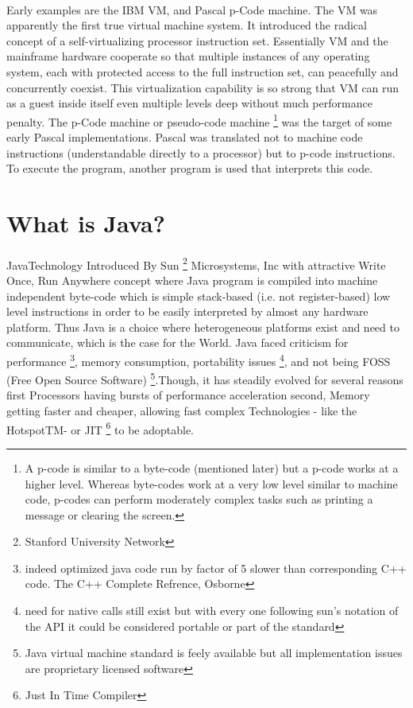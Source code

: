 \paragraph{}
Early examples are the IBM VM, and Pascal p-Code machine. The VM was apparently the first true virtual machine system. It introduced the radical concept of a self-virtualizing processor instruction set. Essentially VM and the mainframe hardware cooperate so that multiple instances of any operating system, each with protected access to the full instruction set, can peacefully and concurrently coexist. This virtualization capability is so strong that VM can run as a guest inside itself even multiple levels deep without much performance penalty. The p-Code machine or pseudo-code machine \footnote{A p-code is similar to a byte-code (mentioned later) but a p-code works at a higher level. Whereas byte-codes work at a very low level similar to machine code, p-codes can perform moderately complex tasks such as printing a message or clearing the screen.} was the target of some early Pascal implementations. Pascal was translated not to machine code instructions (understandable directly to a processor) but to p-code instructions. To execute the program, another program is used that interprets this code.
\section{What is Java?}
\paragraph{}
Java\texttrademark Technology Introduced By Sun \footnote{Stanford University Network} Microsystems, Inc  with attractive Write Once, Run Anywhere concept where Java program is compiled into machine independent byte-code which is simple stack-based (i.e. not register-based) low level instructions in order to be easily interpreted by almost any hardware platform. Thus Java is a choice where heterogeneous platforms exist and need to communicate, which is the case for the World. Java faced criticism for performance \footnote{indeed optimized java code run by factor of 5 slower than corresponding C++ code. The C++ Complete Refrence, Osborne}, memory consumption, portability issues \footnote{need for native calls still exist but with every one following sun’s notation of the API it could be considered portable or part of the standard}, and not being FOSS (Free Open Source Software) \footnote{Java virtual machine standard is feely available but all implementation issues are proprietary licensed software}.Though, it has steadily evolved for several reasons first Processors having bursts of performance acceleration second, Memory getting faster and cheaper, allowing fast complex Technologies - like the HotspotTM- or JIT \footnote{Just In Time Compiler} to be adoptable.
